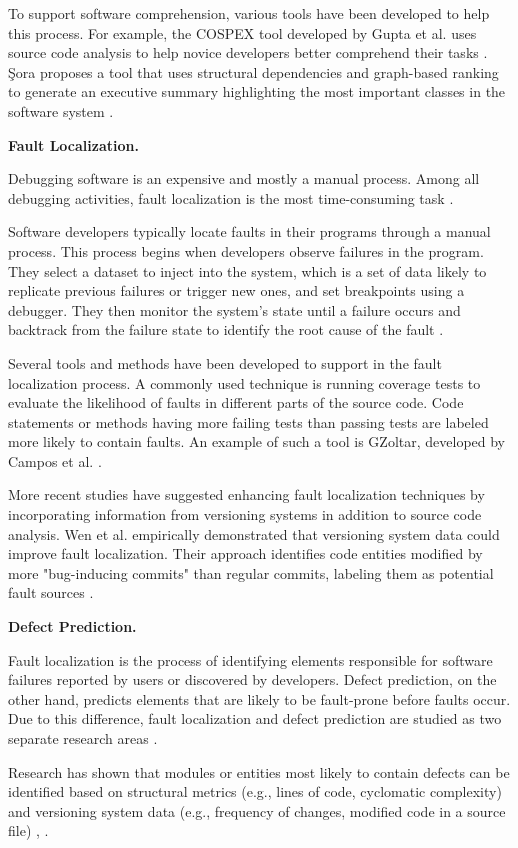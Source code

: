 To support software comprehension, various tools have been developed to help this process. For example, the COSPEX tool developed by Gupta et al. uses source code analysis to help novice developers better comprehend their tasks \cite{Comprehension-Gupta}. Şora proposes a tool that uses structural dependencies and graph-based ranking to generate an executive summary highlighting the most important classes in the software system \cite{enase15}.


\textbf{Fault Localization.}

Debugging software is an expensive and mostly a manual process. Among all debugging activities, fault localization is the most time-consuming task \cite{articleDebugging}. 

Software developers typically locate faults in their programs through a manual process. This process begins when developers observe failures in the program. They select a dataset to inject into the system, which is a set of data likely to replicate previous failures or trigger new ones, and set breakpoints using a debugger. They then monitor the system's state until a failure occurs and backtrack from the failure state to identify the root cause of the fault \cite{fault-localization, program-failures}. 

Several tools and methods have been developed to support in the fault localization process. A commonly used technique is running coverage tests to evaluate the likelihood of faults in different parts of the source code. Code statements or methods having more failing tests than passing tests are labeled more likely to contain faults. An example of such a tool is GZoltar, developed by Campos et al. \cite{fault-gz}. 

More recent studies have suggested enhancing fault localization techniques by incorporating information from versioning systems in addition to source code analysis. Wen et al. empirically demonstrated that versioning system data could improve fault localization. Their approach identifies code entities modified by more "bug-inducing commits" than regular commits, labeling them as potential fault sources \cite{fault-versioning}.


\textbf{Defect Prediction.}

Fault localization is the process of identifying elements responsible for software failures reported by users or discovered by developers. Defect prediction, on the other hand, predicts elements that are likely to be fault-prone before faults occur. Due to this difference, fault localization and defect prediction are studied as two separate research areas \cite{error-prone, fault-survey}.  

Research has shown that modules or entities most likely to contain defects can be identified based on structural metrics (e.g., lines of code, cyclomatic complexity) and versioning system data (e.g., frequency of changes, modified code in a source file) \cite{67595}, \cite{1702015}.
